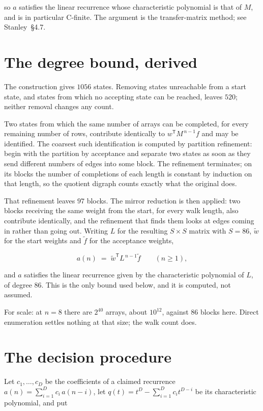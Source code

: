 \documentclass[11pt]{article}
\theoremstyle{definition}
\begin{document}
so $a$ satisfies the linear recurrence whose characteristic polynomial is that of $M$, and is in particular C-finite. The argument is the transfer-matrix method; see Stanley~\S4.7.

\section{The degree bound, derived}

The construction gives $1056$ states. Removing states unreachable from a start state, and states from which no accepting state can be reached, leaves $520$; neither removal changes any count.

Two states from which the same number of arrays can be completed, for every remaining number of rows, contribute identically to $w^{\mathsf T}M^{\,n-1}f$ and may be identified. The coarsest such identification is computed by partition refinement: begin with the partition by acceptance and separate two states as soon as they send different numbers of edges into some block. The refinement terminates; on its blocks the number of completions of each length is constant by induction on that length, so the quotient digraph counts exactly what the original does.

That refinement leaves $97$ blocks. The mirror reduction is then applied: two blocks receiving the same weight from the start, for every walk length, also contribute identically, and the refinement that finds them looks at edges coming in rather than going out. Writing $L$ for the resulting $S \times S$ matrix with $S = 86$, $\tilde w$ for the start weights and $\tilde f$ for the acceptance weights,

\[a(n) \;=\; \tilde w^{\mathsf T} L^{\,n-1} \tilde f \qquad (n \ge 1),\]

and $a$ satisfies the linear recurrence given by the characteristic polynomial of $L$, of degree $86$. This is the only bound used below, and it is computed, not assumed.

For scale: at $n = 8$ there are $2^{40}$ arrays, about $10^{12}$, against $86$ blocks here. Direct enumeration settles nothing at that size; the walk count does.

\section{The decision procedure}

Let $c_1,\dots,c_D$ be the coefficients of a claimed recurrence $a(n) = \sum_{i=1}^{D} c_i\,a(n-i)$, let $q(t) = t^{D} - \sum_{i=1}^{D} c_i t^{D-i}$ be its characteristic polynomial, and put
\end{document}
